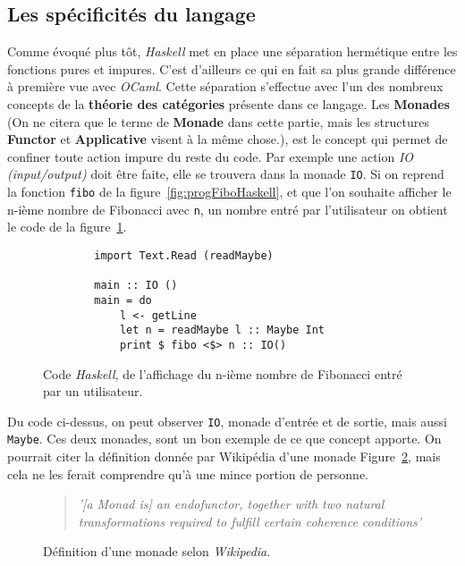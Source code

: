 \subsection{Les spécificités du langage}

Comme évoqué plus tôt, \textit{Haskell} met en place une séparation 
hermétique entre les fonctions pures et impures. C'est d'ailleurs ce qui en fait 
sa plus grande différence à première vue avec \textit{OCaml}. Cette séparation
s'effectue avec l'un des nombreux concepts de la \textbf{théorie des catégories}
présente dans ce langage. Les \textbf{Monades} (On ne citera que le terme de 
\textbf{Monade} dans cette partie, mais les structures \textbf{Functor} et 
\textbf{Applicative} visent à la même chose.), est le concept qui permet de 
confiner toute action impure du reste du code. Par exemple 
une action \textit{IO (input/output)} doit être faite, elle se trouvera dans la 
monade \texttt{IO}. Si on reprend la fonction 
\texttt{fibo} de la figure~\ref{fig:progFiboHaskell}, et que l'on 
souhaite afficher le n-ième nombre de Fibonacci avec \texttt{n}, un 
nombre entré par l'utilisateur on obtient le code de la 
figure~\ref{fig:progInOutFibo}.

\begin{figure}[H]
    \begin{verbatim}
        import Text.Read (readMaybe)
        
        main :: IO ()
        main = do
            l <- getLine
            let n = readMaybe l :: Maybe Int
            print $ fibo <$> n :: IO()
    \end{verbatim}
    \caption{
        Code \textit{Haskell}, de l'affichage du n-ième nombre de Fibonacci
        entré par un utilisateur.
    }\label{fig:progInOutFibo}
\end{figure}

Du code ci-dessus, on peut observer \texttt{IO}, monade 
d'entrée et de sortie, mais aussi \texttt{Maybe}. Ces deux monades,
sont un bon exemple de ce que concept apporte. On pourrait citer la définition 
donnée par Wikipédia d'une monade Figure~\ref{fig:citationMonad}, mais cela ne 
les ferait comprendre qu'à une mince portion de personne.

\begin{figure}[H]
    \begin{quotation}
        \textit{'[a Monad is] an endofunctor, together with two natural 
        transformations required to fulfill certain coherence conditions'
        }\cite{citationMonadWiki}
    \caption{
      Définition d'une monade selon \textit{Wikipedia}.
    }\label{fig:citationMonad}
    \end{quotation}
\end{figure}

